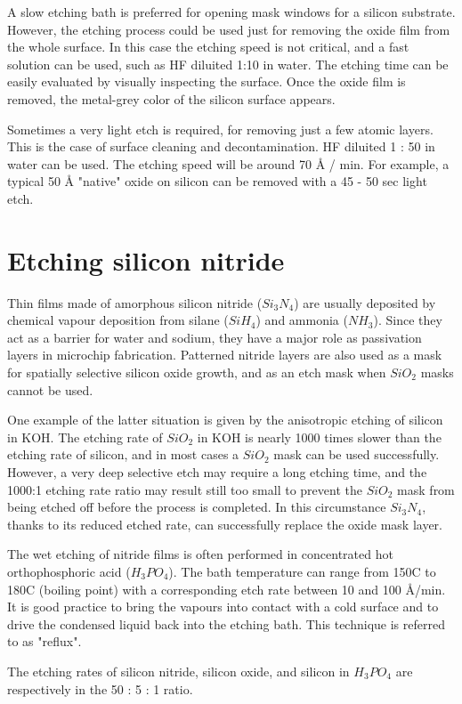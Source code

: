 A slow etching bath is preferred for opening mask windows for a silicon substrate.
However, the etching process could be used just for removing the oxide film from the whole surface.
In this case the etching speed is not critical, and a fast solution can be used, such as HF diluited 1:10 in water.
The etching time can be easily evaluated by visually inspecting the surface.
Once the oxide film is removed, the metal-grey color of the silicon surface appears.

Sometimes a very light etch is required, for removing just a few atomic layers.
This is the case of surface cleaning and decontamination. HF diluited 1 : 50 in water can be used.
The etching speed will be around 70 \r{A} / min. For example, a typical 50 \r{A} "native" oxide on silicon can be removed with a 45 - 50 sec light etch.

\newpage

\section{Etching silicon nitride}
Thin films made of amorphous silicon nitride ($Si_3N_4$) are usually deposited by chemical vapour deposition from silane ($SiH_4$) and ammonia ($NH_3$).
Since they act as a barrier for water and sodium, they have a major role as passivation layers in microchip fabrication.
Patterned nitride layers are also used as a mask for spatially selective silicon oxide growth, and as an etch mask when $SiO_2$ masks cannot be used.

One example of the latter situation is given by the anisotropic etching of silicon in KOH.
The etching rate of $SiO_2$ in KOH is nearly 1000 times slower than the etching rate of silicon, and in most cases a $SiO_2$ mask can be used successfully.
However, a very deep selective etch may require a long etching time, and the 1000:1 etching rate ratio may result still too small to prevent the $SiO_2$ mask from being etched off before the process is completed.
In this circumstance $Si_3N_4$, thanks to its reduced etched rate, can successfully replace the oxide mask layer.

The wet etching of nitride films is often performed in concentrated hot orthophosphoric acid ($H_3PO_4$).
The bath temperature can range from 150\degree C to 180\degree C (boiling point) with a corresponding etch rate between 10 and 100 \r{A}/min. 
It is good practice to bring the vapours into contact with a cold surface and to drive the condensed liquid back into the etching bath.
This technique is referred to as "reflux".\label{chemistry_reflux}

The etching rates of silicon nitride, silicon oxide, and silicon in $H_3PO_4$ are respectively in the 50 : 5 : 1 ratio.

